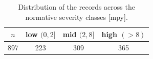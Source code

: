 \begin{table}[htb!]
\centering
\footnotesize
\setlength{\tabcolsep}{4pt}
\caption{Distribution of the records across the normative severity classes [mpy].}
\label{tab:classes}
\begin{tabular}{@{}cccc@{}}
\toprule
$n$ & low $(0,2]$ & mid $(2,8]$ & high $(>8)$ \\
\midrule
\midrule
897 & 223 & 309 & 365 \\
\bottomrule
\end{tabular}
\end{table}
